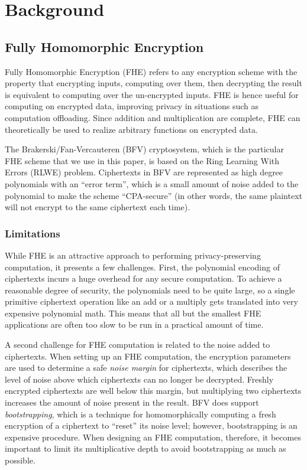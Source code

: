 \section{Background}\label{sec:background}
\subsection{Fully Homomorphic Encryption}
Fully Homomorphic Encryption (FHE) refers to any encryption scheme with the property that encrypting inputs, computing over them, then decrypting the result is equivalent to computing over the un-encrypted inputs. \cite{Gentry}
FHE is hence useful for computing on encrypted data, improving privacy in situations such as computation offloading.
Since addition and multiplication are complete, FHE can theoretically be used to realize arbitrary functions on encrypted data.

The Brakerski/Fan-Vercauteren (BFV) \cite{BFV} cryptosystem, which is the particular FHE scheme that we use in this paper, is based on the Ring Learning With Errors (RLWE) problem.
Ciphertexts in BFV are represented as high degree polynomials with an ``error term'', which is a small amount of noise added to the polynomial to make the scheme ``CPA-secure'' (in other words, the same plaintext will not encrypt to the same ciphertext each time).
\subsubsection{Limitations}
While FHE is an attractive approach to performing privacy-preserving computation, it presents a few challenges.
First, the polynomial encoding of ciphertexts incurs a huge overhead for any secure computation.
To achieve a reasonable degree of security, the polynomials need to be quite large, so a single primitive ciphertext operation like an add or a multiply gets translated into very expensive polynomial math.
This means that all but the smallest FHE applications are often too slow to be run in a practical amount of time.

A second challenge for FHE computation is related to the noise added to ciphertexts.
When setting up an FHE computation, the encryption parameters are used to determine a safe {\em noise margin} for ciphertexts, which describes the level of noise above which ciphertexts can no longer be decrypted.
Freshly encrypted ciphertexts are well below this margin, but multiplying two ciphertexts increases the amount of noise present in the result.
BFV does support {\em bootstrapping}, which is a technique for homomorphically computing a fresh encryption of a ciphertext to ``reset'' its noise level; however, bootstrapping is an expensive procedure.
When designing an FHE computation, therefore, it becomes important to limit its multiplicative depth to avoid bootstrapping as much as possible.

